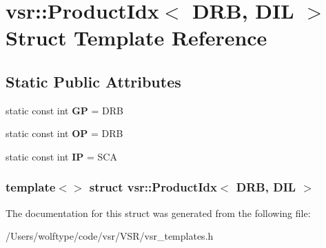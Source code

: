 \hypertarget{structvsr_1_1_product_idx_3_01_d_r_b_00_01_d_i_l_01_4}{\section{vsr\-:\-:Product\-Idx$<$ D\-R\-B, D\-I\-L $>$ Struct Template Reference}
\label{structvsr_1_1_product_idx_3_01_d_r_b_00_01_d_i_l_01_4}
}
\subsection*{Static Public Attributes}
\begin{DoxyCompactItemize}
\item 
\hypertarget{structvsr_1_1_product_idx_3_01_d_r_b_00_01_d_i_l_01_4_aa915dd44e1fa979b5621609c545b0d5b}{static const int {\bfseries G\-P} = D\-R\-B}\label{structvsr_1_1_product_idx_3_01_d_r_b_00_01_d_i_l_01_4_aa915dd44e1fa979b5621609c545b0d5b}

\item 
\hypertarget{structvsr_1_1_product_idx_3_01_d_r_b_00_01_d_i_l_01_4_a5aff446bab3df3414c45d1bf37a21d01}{static const int {\bfseries O\-P} = D\-R\-B}\label{structvsr_1_1_product_idx_3_01_d_r_b_00_01_d_i_l_01_4_a5aff446bab3df3414c45d1bf37a21d01}

\item 
\hypertarget{structvsr_1_1_product_idx_3_01_d_r_b_00_01_d_i_l_01_4_a534d6441128c002b3788ddad6bded30e}{static const int {\bfseries I\-P} = S\-C\-A}\label{structvsr_1_1_product_idx_3_01_d_r_b_00_01_d_i_l_01_4_a534d6441128c002b3788ddad6bded30e}

\end{DoxyCompactItemize}
\subsubsection*{template$<$$>$ struct vsr\-::\-Product\-Idx$<$ D\-R\-B, D\-I\-L $>$}



The documentation for this struct was generated from the following file\-:\begin{DoxyCompactItemize}
\item 
/\-Users/wolftype/code/vsr/\-V\-S\-R/vsr\-\_\-templates.\-h\end{DoxyCompactItemize}
